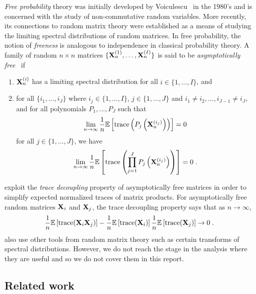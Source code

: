 \textit{Free probability} theory was initially developed by Voiculescu~\citep{Voiculescu:1992} in the 1980's and is concerned with the study of non-commutative random variables. More recently, its connections to random matrix theory were established as a means of studying the limiting spectral distributions of random matrices. In free probability, the notion of \textit{freeness} is analogous to independence in classical probability theory. A family of random $n\times n$ matrices $\{\mathbf{X}_n^{(1)},\ldots,\mathbf{X}_n^{(I)}\}$ is said to be \textit{asymptotically free}~\citep{Couillet:2011_free} if
\begin{enumerate}
\item
$\mathbf{X}_n^{(i)}$ has a limiting spectral distribution for all $i\in\{1,\ldots,I\}$, and
\item
for all $\{i_1,\ldots,i_J\}$ where $i_j\in\{1,\ldots,I\}$, $j\in\{1,\ldots,J\}$ and $i_1\neq i_2,\ldots,i_{J-1}\neq i_J$, and for all polynomials $P_1,\ldots,P_J$ such that
\[
\lim_{n\rightarrow\infty} \frac{1}{n}\mathbb{E}\left[\mathrm{trace}\left(P_j\left(\mathbf{X}_n^{(i_j)}\right)\right)\right] = 0
\]
for all $j\in\{1,\ldots,J\}$, we have
\[
\lim_{n\rightarrow\infty} \frac{1}{n}\mathbb{E}\left[\mathrm{trace}\left(\prod_{j=1}^JP_j\left(\mathbf{X}_n^{(i_j)}\right)\right)\right] = 0 \;.
\]
\end{enumerate}
\citet{Lacotte:2020} exploit the \textit{trace decoupling} property of asymptotically free matrices in order to simplify expected normalized traces of matrix products. For asymptotically free random matrices $\mathbf{X}_i$ and $\mathbf{X}_j$, the trace decoupling property says that as $n\rightarrow\infty$,
\[
\frac{1}{n}\mathbb{E}\left[\mathrm{trace}(\mathbf{X}_i\mathbf{X}_j)\right] - \frac{1}{n}\mathbb{E}\left[\mathrm{trace}(\mathbf{X}_i)\right]\frac{1}{n}\mathbb{E}\left[\mathrm{trace}(\mathbf{X}_j)\right] \rightarrow 0 \;.
\]
\citet{Lacotte:2020} also use other tools from random matrix theory such as certain transforms of spectral distributions. However, we do not reach the stage in the analysis where they are useful and so we do not cover them in this report.


\subsection{Related work} \label{sec:literature}

